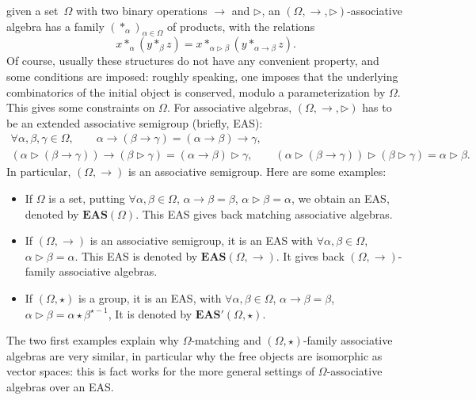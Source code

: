 \documentclass[10pt,a4paper]{amsart}
\numberwithin{equation}{section}
\newcommand{\eas}{\mathbf{EAS}}
\begin{document}
given a set~$\Omega$ with two binary operations $\rightarrow$ and $\triangleright$, an $(\Omega,\rightarrow,\triangleright)$-associative algebra has a family $(*_\alpha)_{\alpha \in \Omega}$ of products, with the relations
\[x*_\alpha (y *_\beta z)=x *_{\alpha\triangleright \beta}(y*_{\alpha \rightarrow \beta}z).\]
Of course, usually these structures do not have any convenient property, and some conditions are imposed: roughly speaking, one imposes that the underlying combinatorics of the initial object is conserved, modulo a parameterization by $\Omega$.
This gives some constraints on $\Omega$. For associative algebras, $(\Omega,\rightarrow,\triangleright)$ has to be an extended associative semigroup (briefly, EAS):
\begin{gather*}
\forall \alpha,\beta,\gamma \in \Omega,\qquad \alpha \rightarrow (\beta \rightarrow \gamma)=(\alpha \rightarrow \beta) \rightarrow \gamma,\\
(\alpha \triangleright (\beta \rightarrow \gamma))\rightarrow (\beta \triangleright \gamma)=(\alpha \rightarrow \beta)\triangleright \gamma,\qquad
(\alpha \triangleright (\beta \rightarrow \gamma))\triangleright (\beta \triangleright \gamma)=\alpha \triangleright \beta.
\end{gather*}
In particular, $(\Omega,\rightarrow)$ is an associative semigroup. Here are some examples:
\begin{itemize}\itemsep=0pt
\item If $\Omega$ is a set, putting
$
 \forall \alpha,\beta \in \Omega$, $ \alpha \rightarrow\beta =\beta$, $\alpha \triangleright \beta =\alpha$,
we obtain an EAS, denoted by $\eas(\Omega)$. This EAS gives back matching associative algebras.
\item If $(\Omega,\rightarrow)$ is an associative semigroup, it is an EAS with
$\forall \alpha,\beta \in \Omega$, $\alpha \triangleright \beta =\alpha$.
This EAS is denoted by $\eas(\Omega,\rightarrow)$. It gives back $(\Omega,\rightarrow)$-family associative algebras.
\item If $(\Omega,\star)$ is a group, it is an EAS, with
$
 \forall \alpha,\beta \in \Omega$, $\alpha \rightarrow\beta =\beta$, $\alpha \triangleright \beta =\alpha\star \beta^{\star -1}$,
It is denoted by $\eas'(\Omega,\star)$. \end{itemize}
The two first examples explain why $\Omega$-matching and $(\Omega,\star)$-family associative algebras are very similar, in particular why the free objects are isomorphic as vector spaces:
this is fact works for the more general settings of $\Omega$-associative algebras over an EAS.
\end{document}

